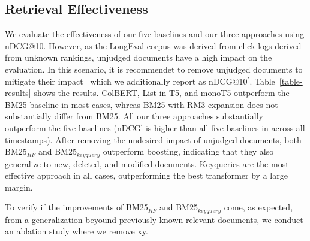 \subsection{Retrieval Effectiveness}




We evaluate the effectiveness of our five baselines and our three approaches using nDCG@10. However, as the LongEval corpus was derived from click logs derived from unknown rankings, unjudged documents have a high impact on the evaluation. In this scenario, it is recommendet to remove unjudged documents to mitigate their impact~\cite{sakai:2007} which we additionally report as nDCG@10$^{'}$. Table~\ref{table-results} shows the results. ColBERT, List-in-T5, and monoT5 outperform the BM25 baseline in most cases, whreas BM25 with RM3 expansion does not substantially differ from BM25. All our three approaches substantially outperform the five baselines (nDCG$^{'}$ is higher than all five baselines in across all timestamps). After removing the undesired impact of unjudged documents, both BM25$_{RF}$ and BM25$_{keyquery}$ outperform boosting, indicating that they also generalize to new, deleted, and modified documents. Keyqueries are the most effective approach in all cases, outperforming the best transformer by a large margin.



To verify if the improvements of BM25$_{RF}$ and BM25$_{keyquery}$ come, as expected, from a generalization beyound previously known relevant documents, we conduct an ablation study where we remove xy.
